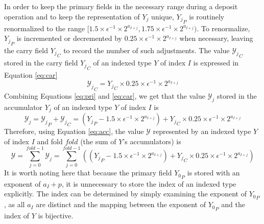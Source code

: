 \documentclass[12pt]{article}
\theoremstyle{definition}
\numberwithin{equation}{section}
\begin{document}
      In order to keep the primary fields in the necessary range during a deposit operation and to keep the representation of $Y_j$ unique, ${Y_j}_P$ is routinely renormalized to the range $[1.5 \times\epsilon^{-1} \times 2^{a_{I + j}}, 1.75 \times\epsilon^{-1} \times 2^{a_{I + j}})$.
      To renormalize, ${Y_j}_P$ is incremented or decremented by $0.25 \times\epsilon^{-1} \times 2^{a_{I + j}}$ when necessary, leaving the carry field ${Y_j}_C$ to record the number of such adjustments.
      The value ${\mathcal{Y}_j}_C$ stored in the carry field ${Y_j}_C$ of an indexed type $Y$ of index $I$ is expressed in Equation \ref{eq:car}
      \begin{equation}
        {\mathcal{Y}_j}_C = {Y_j}_C \times 0.25\times\epsilon^{-1}\times2^{a_{I + j}}
        \label{eq:car}
      \end{equation}
      Combining Equations \ref{eq:pri} and \ref{eq:car}, we get that the value $\mathcal{Y}_j$ stored in the accumulator $Y_j$ of an indexed type $Y$ of index $I$ is
      \begin{equation}
        \mathcal{Y}_j = {\mathcal{Y}_j}_P + {\mathcal{Y}_j}_C = ({Y_j}_P - 1.5 \times\epsilon^{-1}\times 2^{a_{I + j}}) + {Y_j}_C \times 0.25\times\epsilon^{-1}\times2^{a_{I + j}}
        \label{eq:acc}
      \end{equation}
      Therefore, using Equation \ref{eq:acc}, the value $\mathcal{Y}$ represented by an indexed type $Y$ of index $I$ and fold $fold$ (the sum of $Y$'s accumulators) is
      \begin{equation}
        \mathcal{Y} = \sum\limits_{j = 0}^{fold - 1} \mathcal{Y}_j = \sum\limits_{j = 0}^{fold - 1} (({Y_j}_P - 1.5 \times\epsilon^{-1}\times 2^{a_{I + j}}) + {Y_j}_C \times 0.25\times\epsilon^{-1}\times2^{a_{I + j}})
        \label{eq:indexedvalue}
      \end{equation}
      It is worth noting here that because the primary field ${Y_0}_P$ is stored with an exponent of $a_I + p$, it is unnecessary to store the index of an indexed type explicitly. The index can be determined by simply examining the exponent of ${Y_0}_P$, as all $a_I$ are distinct and the mapping between the exponent of ${Y_0}_P$ and the index of $Y$ is bijective.
\end{document}
